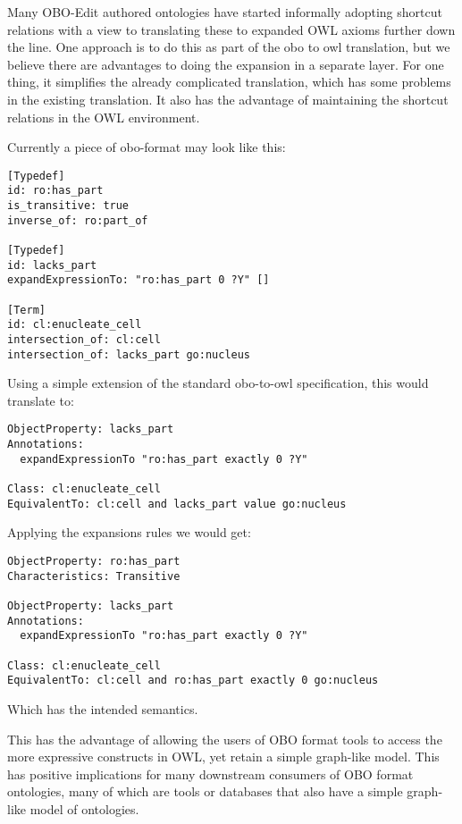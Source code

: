 \documentclass{llncs}
\begin{document}
Many OBO-Edit authored ontologies have started informally adopting
shortcut relations with a view to translating these to expanded OWL
axioms further down the line. One approach is to do this as part of
the obo to owl translation, but we believe there are advantages to
doing the expansion in a separate layer. For one thing, it simplifies
the already complicated translation, which has some problems in the
existing translation. It also has the advantage of maintaining the
shortcut relations in the OWL environment.

Currently a piece of obo-format may look like this:

\begin{verbatim}
[Typedef]
id: ro:has_part
is_transitive: true
inverse_of: ro:part_of

[Typedef]
id: lacks_part
expandExpressionTo: "ro:has_part 0 ?Y" []

[Term]
id: cl:enucleate_cell
intersection_of: cl:cell
intersection_of: lacks_part go:nucleus
\end{verbatim}

Using a simple extension of the standard obo-to-owl specification, this
would translate to:

\begin{verbatim}
ObjectProperty: lacks_part
Annotations:
  expandExpressionTo "ro:has_part exactly 0 ?Y"

Class: cl:enucleate_cell
EquivalentTo: cl:cell and lacks_part value go:nucleus
\end{verbatim}

Applying the expansions rules we would get:

\begin{verbatim}
ObjectProperty: ro:has_part
Characteristics: Transitive

ObjectProperty: lacks_part
Annotations:
  expandExpressionTo "ro:has_part exactly 0 ?Y"

Class: cl:enucleate_cell
EquivalentTo: cl:cell and ro:has_part exactly 0 go:nucleus
\end{verbatim}

Which has the intended semantics.

This has the advantage of allowing the users of OBO format tools to
access the more expressive constructs in OWL, yet retain a simple
graph-like model. This has positive implications for many downstream
consumers of OBO format ontologies, many of which are tools or
databases that also have a simple graph-like model of ontologies.
\end{document}
